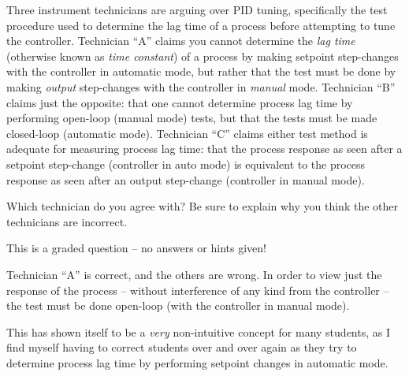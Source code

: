 

Three instrument technicians are arguing over PID tuning, specifically the test procedure used to determine the lag time of a process before attempting to tune the controller.  Technician ``A'' claims you cannot determine the {\it lag time} (otherwise known as {\it time constant}) of a process by making setpoint step-changes with the controller in automatic mode, but rather that the test must be done by making {\it output} step-changes with the controller in {\it manual} mode.  Technician ``B'' claims just the opposite: that one cannot determine process lag time by performing open-loop (manual mode) tests, but that the tests must be made closed-loop (automatic mode).  Technician ``C'' claims either test method is adequate for measuring process lag time: that the process response as seen after a setpoint step-change (controller in auto mode) is equivalent to the process response as seen after an output step-change (controller in manual mode).

\vskip 10pt

Which technician do you agree with?  Be sure to explain why you think the other technicians are incorrect.

\vfil

\eject






This is a graded question -- no answers or hints given!







Technician ``A'' is correct, and the others are wrong.  In order to view just the response of the process -- without interference of any kind from the controller -- the test must be done open-loop (with the controller in manual mode).

This has shown itself to be a {\it very} non-intuitive concept for many students, as I find myself having to correct students over and over again as they try to determine process lag time by performing setpoint changes in automatic mode.




